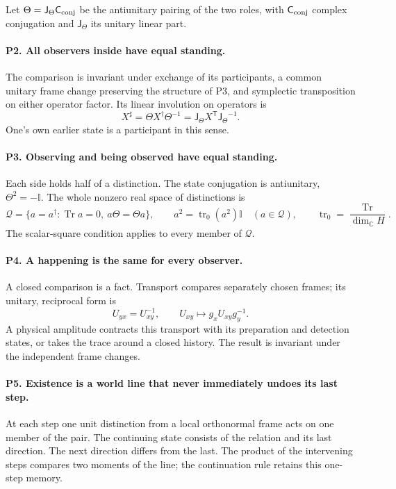\documentclass[aps,prx,onecolumn,10pt,notitlepage,nofootinbib,longbibliography]{revtex4-2}
\numberwithin{equation}{section}
\numberwithin{table}{section}
\newcommand{\Id}{\mathbb I}
\newcommand{\CC}{\mathbb C}
\newcommand{\Tr}{\operatorname{Tr}}
\newcommand{\trn}{\operatorname{tr}_0}
\begin{document}
Let $\Theta={\mathsf J_\Theta}{\mathsf C_{\rm conj}}$ be the antiunitary pairing of the two roles, with ${\mathsf C_{\rm conj}}$ complex conjugation and ${\mathsf J_\Theta}$ its unitary linear part.

\paragraph*{P2. All observers inside have equal standing.}
The comparison is invariant under exchange of its participants, a common unitary frame change preserving the structure of P3, and symplectic transposition on either operator factor. Its linear involution on operators is
\begin{equation}
 X^\sharp=\Theta X^\dagger\Theta^{-1}={\mathsf J_\Theta}X^{\mathsf T}{\mathsf J_\Theta}^{-1}.
 \label{eq:symplectictranspose}
\end{equation}
One's own earlier state is a participant in this sense.

\paragraph*{P3. Observing and being observed have equal standing.}
Each side holds half of a distinction. The state conjugation is antiunitary, $\Theta^2=-\Id$. The whole nonzero real space of distinctions is
\begin{equation}
 \mathscr Q=\{a=a^\dagger:\Tr a=0,\ a\Theta=\Theta a\},\qquad
 a^2=\trn(a^2)\Id\quad(a\in\mathscr Q),\qquad
 \trn=\frac{\Tr}{\dim_{\CC}H}.
 \label{eq:fullspacepostulate}
\end{equation}
The scalar-square condition applies to every member of $\mathscr Q$.

\paragraph*{P4. A happening is the same for every observer.}
A closed comparison is a fact. Transport compares separately chosen frames; its unitary, reciprocal form is
\begin{equation}
 U_{yx}=U_{xy}^{-1},\qquad U_{xy}\longmapsto g_xU_{xy}g_y^{-1}.
 \label{eq:reciprocaltransport}
\end{equation}
A physical amplitude contracts this transport with its preparation and detection states, or takes the trace around a closed history. The result is invariant under the independent frame changes.

\paragraph*{P5. Existence is a world line that never immediately undoes its last step.}
At each step one unit distinction from a local orthonormal frame acts on one member of the pair. The continuing state consists of the relation and its last direction. The next direction differs from the last. The product of the intervening steps compares two moments of the line; the continuation rule retains this one-step memory.
\end{document}
